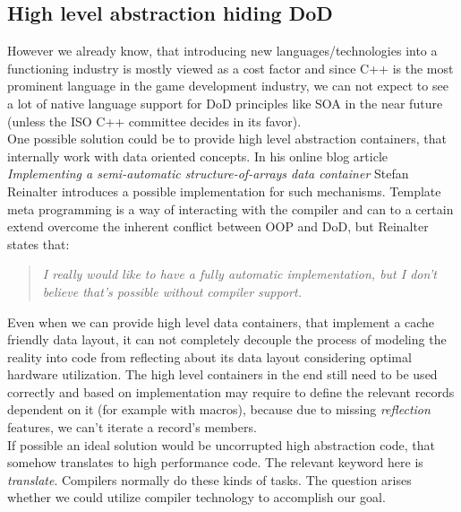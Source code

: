 \subsection{High level abstraction hiding DoD}
However we already know, that introducing new languages/technologies into a functioning industry is mostly viewed as a cost factor and since C++ is the most prominent language in the game development industry, we can not expect to see a lot of native language support for DoD principles like SOA in the near future (unless the ISO C++ committee decides in its favor).\\
One possible solution could be to provide high level abstraction containers, that internally work with data oriented concepts. In his online blog article \textit{Implementing a semi-automatic structure-of-arrays data container}  Stefan Reinalter introduces a possible implementation for such mechanisms. Template meta programming is a way of interacting with the compiler and can to a certain extend overcome the inherent conflict between OOP and DoD, but Reinalter states that:
\begin{quote}
	\textit{I really would like to have a fully automatic implementation, but I don’t believe that’s possible without compiler support.} 
\end{quote}
Even when we can provide high level data containers, that implement a cache friendly data layout, it can not completely decouple the process of modeling the reality into code from reflecting about its data layout considering optimal hardware utilization. The high level containers in the end still need to be used correctly and based on implementation may require to define the relevant records dependent on it (for example with macros), because due to missing \textit{reflection} features, we can't iterate a record's members.\\
If possible an ideal solution would be uncorrupted high abstraction code, that somehow translates to high performance code. The relevant keyword here is \textit{translate}. Compilers normally do these kinds of tasks. The question arises whether we could utilize compiler technology to accomplish our goal.